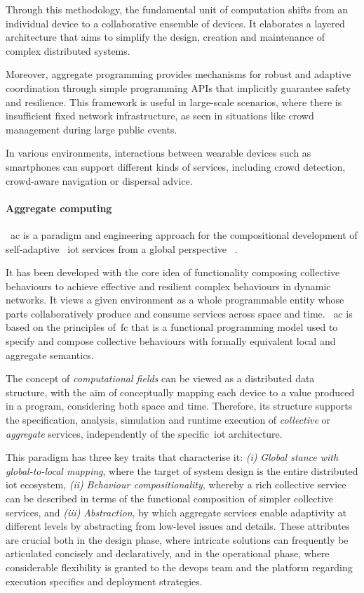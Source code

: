 Through this methodology, the fundamental unit of computation shifts from an individual device to a collaborative
ensemble of devices.
It elaborates a layered architecture that aims to simplify the design, creation and maintenance of complex distributed
systems.

Moreover, aggregate programming provides mechanisms for robust and adaptive coordination through simple programming APIs
that implicitly guarantee safety and resilience.
This framework is useful in large-scale scenarios, where there is insufficient fixed network infrastructure, as seen in
situations like crowd management during large public events.

In various environments, interactions between wearable devices such as smartphones can support different kinds of services,
including crowd detection, crowd-aware navigation or dispersal advice.

\paragraph{Aggregate computing}
~\ac{ac} is a paradigm and engineering approach for the compositional development of self-adaptive ~\ac{iot} services
from a global perspective ~\cite{10.1145/3579353}.

It has been developed with the core idea of functionality composing collective behaviours to achieve effective and resilient
complex behaviours in dynamic networks.
It views a given environment as a whole programmable entity whose parts collaboratively produce and consume services
across space and time.
~\ac{ac} is based on the principles of~\ac{fc} that is a functional programming model used to specify
and compose collective behaviours with formally equivalent local and aggregate semantics.

The concept of \emph{computational fields} can be viewed as a distributed data structure,
with the aim of conceptually mapping each device to a value produced in a program, considering both
space and time.
Therefore, its structure supports the specification, analysis, simulation and runtime execution of \emph{collective}
or \emph{aggregate} services, independently of the specific~\ac{iot} architecture.

This paradigm has three key traits that characterise it:
    \emph{(i)} \emph{Global stance with global-to-local mapping}, where the target of system design is the entire distributed
        \ac{iot} ecosystem,
    \emph{(ii)} \emph{Behaviour compositionality}, whereby a rich collective service can be described in terms of the functional
        composition of simpler collective services, and
    \emph{(iii)} \emph{Abstraction}, by which aggregate services enable adaptivity at different levels by abstracting from low-level
        issues and details.
These attributes are crucial both in the design phase, where intricate solutions can frequently be articulated concisely
and declaratively, and in the operational phase, where considerable flexibility is granted to the devops team and the
platform regarding execution specifics and deployment strategies.


